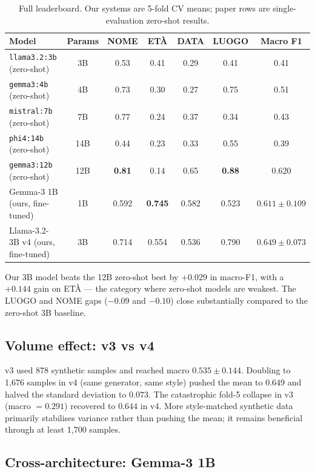 \documentclass[11pt,a4paper]{article}
\begin{document}
\begin{table}[h]
\centering
\caption{Full leaderboard. Our systems are 5-fold CV means; paper rows are single-evaluation zero-shot results.}
\label{tab:leaderboard}
\begin{tabular}{lcccccc}
\toprule
Model & Params & NOME & ETÀ & DATA & LUOGO & Macro F1 \\
\midrule
\texttt{llama3.2:3b} (zero-shot)  & 3B  & 0.53 & 0.41 & 0.29 & 0.41 & 0.41 \\
\texttt{gemma3:4b}   (zero-shot)  & 4B  & 0.73 & 0.30 & 0.27 & 0.75 & 0.51 \\
\texttt{mistral:7b}  (zero-shot)  & 7B  & 0.77 & 0.24 & 0.37 & 0.34 & 0.43 \\
\texttt{phi4:14b}    (zero-shot)  & 14B & 0.44 & 0.23 & 0.33 & 0.55 & 0.39 \\
\texttt{gemma3:12b}  (zero-shot)  & 12B & \textbf{0.81} & 0.14 & 0.65 & \textbf{0.88} & 0.620 \\
\midrule
Gemma-3 1B (ours, fine-tuned)      & 1B  & 0.592 & \textbf{0.745} & 0.582 & 0.523 & $0.611 \pm 0.109$ \\
Llama-3.2-3B v4 (ours, fine-tuned) & 3B  & 0.714 & 0.554 & 0.536 & 0.790 & $\mathbf{0.649 \pm 0.073}$ \\
\bottomrule
\end{tabular}
\end{table}

Our 3B model beats the 12B zero-shot best by $+0.029$ in macro-F1, with a $+0.144$ gain on ETÀ — the category where zero-shot models are weakest. The LUOGO and NOME gaps ($-0.09$ and $-0.10$) close substantially compared to the zero-shot 3B baseline.

\subsection{Volume effect: v3 vs v4}

v3 used 878 synthetic samples and reached macro $0.535 \pm 0.144$. Doubling to 1{,}676 samples in v4 (same generator, same style) pushed the mean to $0.649$ and halved the standard deviation to $0.073$. The catastrophic fold-5 collapse in v3 (macro $= 0.291$) recovered to $0.644$ in v4. More style-matched synthetic data primarily stabilises variance rather than pushing the mean; it remains beneficial through at least 1{,}700 samples.

\subsection{Cross-architecture: Gemma-3 1B}
\end{document}
